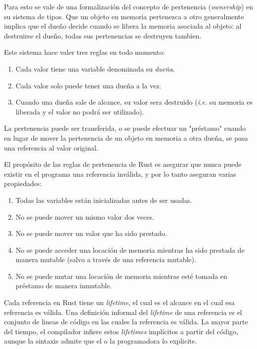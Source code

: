 \documentclass[11pt, a4paper]{article}
\begin{document}
Para esto se vale de una formalización del concepto de pertenencia (\textit{ownership}) en su sistema de tipos.
Que un objeto en memoria pertenezca a otro generalmente implica que el dueño decide cuando se libera la memoria asociada al objeto: al destruirse el dueño, todas sus pertenencias se destruyen tambien.

Este sistema hace valer tres reglas en todo momento:

\begin{enumerate}
\item Cada valor tiene una variable denominada su \textit{dueña}.
\item Cada valor solo puede tener una dueña a la vez.
\item Cuando una dueña sale de alcance, su valor sera destruido (\textit{i.e.} su memoria es liberada y el valor no podrá ser utilizado).
\end{enumerate}

La pertenencia puede ser transferida, o se puede efectuar un "préstamo" cuando en lugar de mover la pertenencia de un objeto en memoria a otra dueña, se pasa una referencia al valor original.

El propósito de las reglas de pertenencia de Rust es asegurar que nunca puede existir en el programa una referencia inválida, y por lo tanto aseguran varias propiedades:

\begin{enumerate}
\item Todas las variables están inicializadas antes de ser usadas.
\item No se puede mover un mismo valor dos veces.
\item No se puede mover un valor que ha sido prestado.
\item No se puede acceder una locación de memoria mientras ha sido prestada de manera mutable (salvo a través de una referencia mutable).
\item No se puede mutar una locación de memoria mientras esté tomada en préstamo de manera inmutable.
\end{enumerate}

Cada referencia en Rust tiene un \textit{lifetime}, el cual es el alcance en el cual esa referencia es válida.
Una definición informal del \textit{lifetime} de una referencia es el conjunto de lineas de código en las cuales la referencia es válida.
La mayor parte del tiempo, el compilador infiere estos \textit{lifetimes} implícitos a partir del código, aunque la sintaxis admite que el o la programadora lo explicite.
\end{document}
